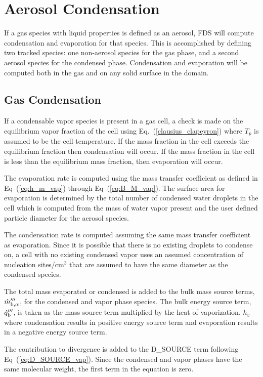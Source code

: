 \newpage
\section{Aerosol Condensation}

If a gas species with liquid properties is defined as an aerosol, FDS will compute condensation and evaporation for that species. This is accomplished by defining two tracked species: one non-aerosol species for the gas phase, and a second aerosol species for the condensed phase. Condensation and evaporation will be computed both in the gas and on any solid surface in the domain.

\subsection{Gas Condensation}
If a condensable vapor species is present in a gas cell, a check is made on the equilibrium vapor fraction of the cell using Eq.~(\ref{clausius_clapeyron}) where $T_p$ is assumed to be the cell temperature. If the mass fraction in the cell exceeds the equilibrium fraction then condensation will occur. If the mass fraction in the cell is less than the equilibrium mass fraction, then evaporation will occur.

The evaporation rate is computed using the mass transfer coefficient as defined in Eq~(\ref{eq:h_m_vap}) through Eq~(\ref{eq:B_M_vap}). The surface area for evaporation is determined by the total number of condensed water droplets in the cell which is computed from the mass of water vapor present and the user defined particle diameter for the aerosol species.

The condensation rate is computed assuming the same mass transfer coefficient as evaporation. Since it is possible that there is no existing droplets to condense on, a cell with no existing condensed vapor uses an assumed concentration of nucleation sites/cm$^3$ that are assumed to have the same diameter as the condensed species.

The total mass evaporated or condensed is added to the bulk mass source terms, $\dot{m}_{{\rm b},\alpha}^{{\prime\prime\prime}}$, for the condensed and vapor phase species. The bulk energy source term, $\dot{q}_{\rm b}^{{\prime\prime\prime}}$, is taken as the mass source term multiplied by the heat of vaporization, $h_v$ where condensation results in positive energy source term and evaporation results in a negative energy source term.

The contribution to divergence is added to the {\ct D\_SOURCE} term following Eq~(\ref{eq:D_SOURCE_vap}). Since the condensed and vapor phases have the same molecular weight, the first term in the equation is zero.

